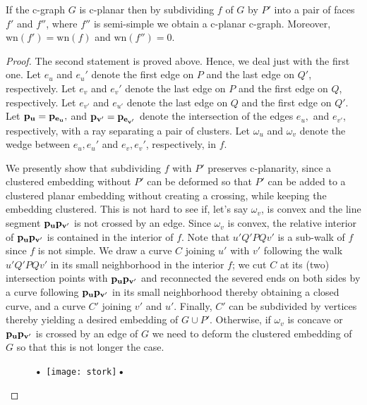 \documentclass{llncs}
\def\wn{\mathrm{wn}}
\newif\iflong
\begin{document}
\begin{lemma}
\label{lemma:norm}
If the c-graph $G$ is c-planar then by subdividing $f$ of $G$ by $P'$ into
a pair of faces $f'$ and $f''$, where $f''$ is semi-simple we obtain a c-planar c-graph. Moreover, 
$\wn(f')=\wn(f)$ and $\wn(f'')=0$.
\end{lemma}
\begin{proof}
The second statement is proved above.
Hence, we deal just with the first one.
Let $e_{u}$ and $e_{u}'$ denote the first edge on $P$ and the last edge on $Q'$, respectively. Let $e_{v}$ and $e_v'$
denote the last edge on $P$ and the first edge on $Q$, respectively.
Let $e_{v'}$ and $e_{u'}$ denote the last edge on $Q$ and the first edge on $Q'$.
Let  ${\bf p_{u}=p_{e_{u}}}, \iflong {\bf p_{u}'=p_{e_{u}'}}, {\bf p_{u'}=p_{e_{u'}}}, {\bf p_{v}}={\bf p_{e_v}},{\bf p_{v}'}={\bf p_{e_{v}'}}\fi$  and ${\bf p_{v'}=p_{e_{v'}}}$
 denote the intersection of the edges $e_u,\iflong e_{u}',e_{u'},e_v,e_v'\fi$ and $e_{v'}$, respectively,  with a ray separating a pair of clusters.
Let $\omega_u$ and $\omega_v$ denote the wedge between $e_u,e_u'$ and $e_v,e_v'$, respectively, in $f$.


We presently show that subdividing $f$ with $P'$  preserves c-planarity, since a clustered
embedding without $P'$ can be deformed so that $P'$ can be added to a clustered planar embedding without creating a crossing, while keeping the embedding clustered. 
This is not hard to see if, let's say $\omega_v$, is convex and the line segment ${\bf p_up_{v'}}$ is not crossed by an edge. Since $\omega_v$ is
convex, the relative interior of ${\bf p_up_{v'}}$ is contained in the interior of $f$. Note that $u'Q'PQv'$ is a sub-walk of $f$ since $f$ is not simple. We draw a curve $C$ joining $u'$ with $v'$ following the walk $u'Q'PQv'$ in its small neighborhood in the interior $f$; we cut $C$ at its (two) intersection points with ${\bf p_up_{v'}}$ and reconnected the severed ends on both sides by a curve following ${\bf p_up_{v'}}$ in its small neighborhood thereby obtaining a closed curve, and a curve $C'$ joining  $v'$ and $u'$. Finally, $C'$ can be subdivided by vertices thereby 
yielding a desired embedding of $G\cup P'$.
Otherwise, if $\omega_v$ is concave
or ${\bf p_up_{v'}}$ is crossed by an edge of $G$ we need to deform the clustered
embedding of $G$ so that this is not longer the case.

 \begin{figure}[h]
  \centering
\centering\textbf{•}
{
\texttt{[image: stork]}\textbf{•}
    	}


\end{figure}
\end{proof}
\end{document}

